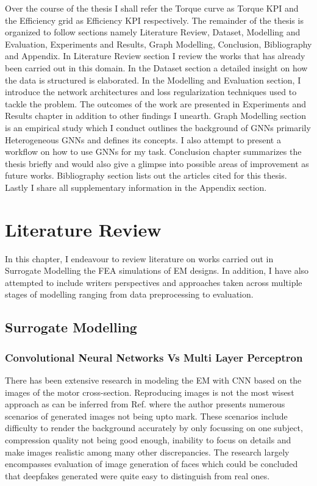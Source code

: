 \documentclass{report} %
\begin{document}
Over the course of the thesis I shall refer the Torque curve as Torque \ac{KPI} and the Efficiency grid as Efficiency \ac{KPI} respectively.
The remainder of the thesis is organized to follow sections namely Literature Review, Dataset, Modelling and Evaluation, Experiments and Results, Graph Modelling, Conclusion, 
Bibliography and Appendix.
In Literature Review section I review the works that has already been carried out in this domain. 
In the Dataset section a detailed insight on how the data is structured is elaborated.
In the Modelling and Evaluation section, I introduce the network architectures and loss regularization techniques used to tackle the problem.
The outcomes of the work are presented in Experiments and Results chapter in addition to other findings I unearth.
Graph Modelling section is an empirical study which I conduct outlines the background of \ac{GNN}s primarily Heterogeneous \ac{GNN}s and defines its concepts. I also attempt to 
present a workflow on how to use \ac{GNN}s for my task.
Conclusion chapter summarizes the thesis briefly and would also give a glimpse into possible areas of improvement as future works. 
Bibliography section lists out the articles cited for this thesis. 
Lastly I share all supplementary information in the Appendix section.

\chapter{Literature Review} 

In this chapter, I endeavour to review literature on works carried out in Surrogate Modelling the \ac{FEA} simulations of \ac{EM} designs. In addition, I have also 
attempted to include writers perspectives and approaches taken across multiple stages of modelling ranging from data preprocessing to evaluation.

\section{Surrogate Modelling}\label{sec:Surrogate Modelling}

\subsection{Convolutional Neural Networks Vs Multi Layer Perceptron}\label{subsec:LR CNN Vs MLP}

There has been extensive research in modeling the \ac{EM} with \ac{CNN} based on the images of the motor cross-section. Reproducing images is not the most wisest 
approach as can be inferred from Ref. \cite{DFIG-2023} where the author presents numerous scenarios of generated images not being upto mark. These scenarios include 
difficulty to render the background accurately by only focussing on one subject, compression quality not being good enough, inability to focus on details and make 
images realistic among many other discrepancies. The research largely encompasses evaluation of image generation of faces which could be concluded that deepfakes generated were quite easy to 
distinguish from real ones.\\
\end{document}
